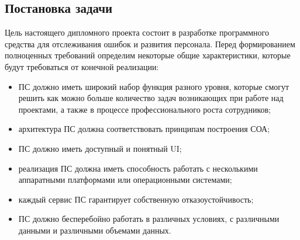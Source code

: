 \subsection{Постановка задачи}\label{sec:analysis:task}

Цель настоящего дипломного проекта состоит в разработке программного средства для отслеживания ошибок и развития персонала. Перед формированием полноценных требований определим некоторые общие характеристики, которые будут требоваться от конечной реализации:
\begin{itemize}
    \item ПС должно иметь широкий набор функция разного уровня, которые смогут решить как можно больше количество задач возникающих при работе над проектами, а также в процессе профессионального роста сотрудников;
    \item архитектура ПС должна соответствовать принципам построения СОА;
    \item ПС должно иметь доступный и понятный UI;
    \item реализация ПС должна иметь способность работать с несколькими аппаратными платформами или операционными системами;
    \item каждый сервис ПС гарантирует собственную отказоустойчивость;
    \item ПС должно бесперебойно работать в различных условиях, с различными данными и различными объемами данных.
\end{itemize}
